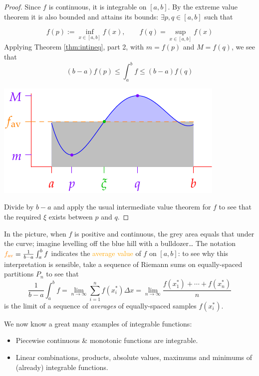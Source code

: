 \begin{proof}
	Since $f$ is continuous, it is integrable on $[a,b]$. By the extreme value theorem it is also bounded and attains its bounds: $\exists p,q\in[a,b]$ such that\par
	\begin{minipage}[t]{0.55\linewidth}\vspace{-5pt}
		\[
			f(p):=\inf\limits_{x\in[a,b]}f(x),\qquad f(q)=\sup\limits_{x\in[a,b]}f(x)
		\]
		Applying Theorem \ref{thm:intineq}, part 2, with $m=f(p)$ and $M=f(q)$, we see that
		\[
			(b-a)f(p)\le\int_a^bf\le (b-a)f(q)
		\]
	\end{minipage}
	\hfill
	\begin{minipage}[t]{0.44\linewidth}\vspace{-5pt}
		\flushright\includegraphics[scale=0.95]{average}
	\end{minipage}\bigbreak

	Divide by $b-a$ and apply the usual intermediate value theorem for $f$ to see that the required $\xi$ exists between $p$ and $q$.
\end{proof}

In the picture, when $f$ is positive and continuous, the grey area equals that under the curve; imagine levelling off the blue hill with a bulldozer\ldots{} The notation $\textcolor{orange}{f_{\text{av}}}=\frac 1{b-a}\int_a^bf$ indicates the \textcolor{orange}{average value} of $f$ on $[a,b]$: to see why this interpretation is sensible, take a sequence of Riemann sums on equally-spaced partitions $P_n$ to see that
\[
	\frac 1{b-a}\int_a^b f 
	=\lim_{n\to\infty}\sum_{i=1}^nf(x_i^*)\Delta x
	=\lim_{n\to\infty}\frac{f(x_1^*)+\cdots+f(x_n^*)}n
\]
is the limit of a sequence of \emph{averages} of equally-spaced samples $f(x_i^*)$.


\goodbreak



We now know a great many examples of integrable functions:
\begin{itemize}\itemsep0pt
  \item Piecewise continuous \& monotonic functions are integrable.
  \item Linear combinations, products, absolute values, maximums and minimums of (already) integrable functions.
\end{itemize}

